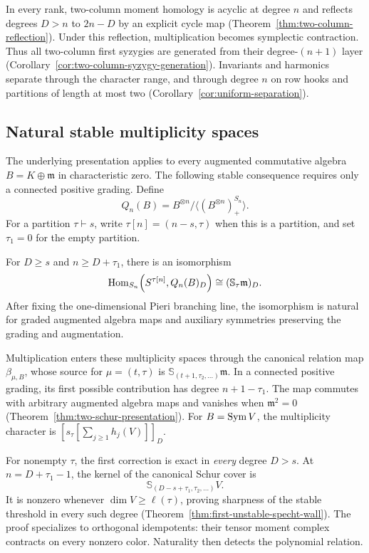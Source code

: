 In every rank, two-column moment homology is acyclic at degree $n$
and reflects degrees $D>n$ to $2n-D$ by an explicit cycle map
(Theorem~\ref{thm:two-column-reflection}). Under this reflection,
multiplication becomes symplectic contraction. Thus all two-column
first syzygies are generated from their degree-$(n+1)$ layer
(Corollary~\ref{cor:two-column-syzygy-generation}).
Invariants and harmonics separate through the character range,
and through degree $n$ on row hooks and partitions of length at most two
(Corollary~\ref{cor:uniform-separation}).

\subsection{Natural stable multiplicity spaces}

The underlying presentation applies to every augmented commutative
algebra $B=K\oplus\mathfrak m$ in characteristic zero. The following
stable consequence requires only a connected positive grading.  Define
\[
 Q_n(B)=B^{\otimes n}/
       \bigl\langle(B^{\otimes n})^{S_n}_+\bigr\rangle.
\]
For a partition $\tau\vdash s$, write $\tau[n]=(n-s,\tau)$
when this is a partition, and set $\tau_1=0$ for the empty partition.

\begin{samepage}
\begin{maintheorem}
\label{thm:intro-stable-spaces}
For $D\ge s$ and $n\ge D+\tau_1$, there is an isomorphism
\[
 \operatorname{Hom}_{S_n}\!\left(S^{\tau[n]},Q_n(B)_D\right)
                   \cong(\mathbb S_\tau\mathfrak m)_D.
\]
After fixing the one-dimensional Pieri branching line, the
isomorphism is natural for graded augmented algebra maps and
auxiliary symmetries preserving the grading and augmentation.
\end{maintheorem}
\end{samepage}

Multiplication enters these multiplicity spaces through the canonical
relation map $\beta_{\mu,B}$, whose source for $\mu=(t,\tau)$ is
$\mathbb S_{(t+1,\tau_2,\ldots)}\mathfrak m$. In a connected positive
grading, its first possible contribution has degree $n+1-\tau_1$.
The map commutes with arbitrary augmented algebra maps and vanishes
when $\mathfrak m^2=0$ (Theorem~\ref{thm:two-schur-presentation}).
For $B=\operatorname{Sym} V$, the multiplicity character is
$[s_\tau[\sum_{j\ge1}h_j(V)]]_D$.

For nonempty $\tau$, the first correction is exact in \emph{every} degree $D>s$.
At $n=D+\tau_1-1$, the kernel of the canonical Schur cover is
\[
                \mathbb S_{(D-s+\tau_1,\tau_2,\ldots)}V.
\]
It is nonzero whenever $\dim V\ge\ell(\tau)$, proving sharpness of
the stable threshold in every such degree
(Theorem~\ref{thm:first-unstable-specht-wall}). The proof specializes
to orthogonal idempotents: their tensor moment complex contracts on
every nonzero color. Naturality then detects the polynomial relation.

